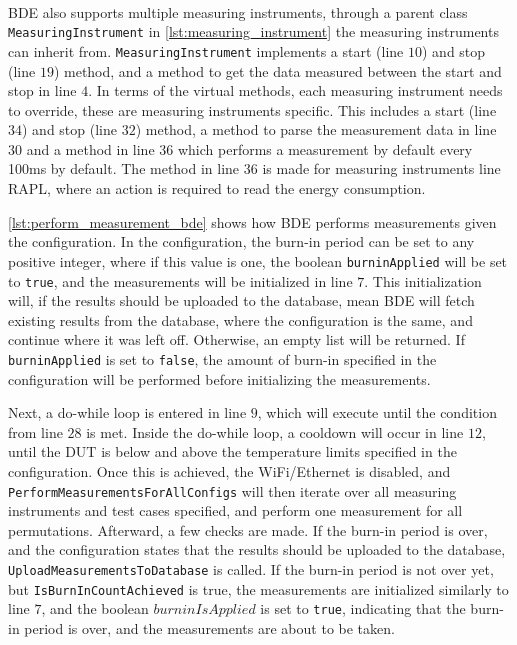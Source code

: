 

\paragraph*{}
BDE also supports multiple measuring instruments, through a parent class \texttt{MeasuringInstrument} in \cref{lst:measuring_instrument} the measuring instruments can inherit from. \texttt{MeasuringInstrument} implements a start (line $10$) and stop (line $19$) method, and a method to get the data measured between the start and stop in line $4$. In terms of the virtual methods, each measuring instrument needs to override, these are measuring instruments specific. This includes a start (line $34$) and stop (line $32$) method, a method to parse the measurement data in line $30$ and a method in line $36$ which performs a measurement by default every 100ms by default. The method in line $36$ is made for measuring instruments line RAPL, where an action is required to read the energy consumption.



\cref{lst:perform_measurement_bde} shows how BDE performs measurements given the configuration. In the configuration, the burn-in period can be set to any positive integer, where if this value is one, the boolean \texttt{burninApplied} will be set to \texttt{true}, and the measurements will be initialized in line $7$. This initialization will, if the results should be uploaded to the database, mean BDE will fetch existing results from the database, where the configuration is the same, and continue where it was left off. Otherwise, an empty list will be returned. If \texttt{burninApplied} is set to \texttt{false}, the amount of burn-in specified in the configuration will be performed before initializing the measurements.

Next, a do-while loop is entered in line $9$, which will execute until the condition  from line $28$ is met. Inside the do-while loop, a cooldown will occur in line $12$, until the DUT is below and above the temperature limits specified in the configuration. Once this is achieved, the WiFi/Ethernet is disabled, and \texttt{PerformMeasurementsForAllConfigs} will then iterate over all measuring instruments and test cases specified, and perform one measurement for all permutations. Afterward, a few checks are made. If the burn-in period is over, and the configuration states that the results should be uploaded to the database, \texttt{UploadMeasurementsToDatabase} is called. If the burn-in period is not over yet, but \texttt{IsBurnInCountAchieved} is true, the measurements are initialized similarly to line $7$, and the boolean $burninIsApplied$ is set to \texttt{true}, indicating that the burn-in period is over, and the measurements are about to be taken. 
